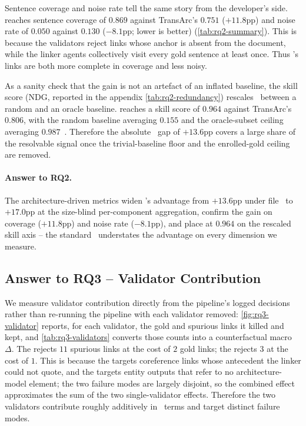 Sentence coverage and noise rate tell the same story from the developer's side.
\approach{} reaches sentence coverage of $0.869$ against TransArc's $0.751$ ($+11.8$pp) and noise rate of $0.050$ against $0.130$ ($-8.1$pp; lower is better) (\autoref{tab:rq2-summary}).
This is because the validators reject links whose anchor is absent from the document, while the linker agents collectively visit every gold sentence at least once.
Thus \approach{}'s links are both more complete in coverage and less noisy.

As a sanity check that the gain is not an artefact of an inflated baseline, the skill score (NDG, reported in the appendix \autoref{tab:rq2-redundancy}) rescales \fone\ between a random and an oracle baseline.
\approach{} reaches a skill score of $0.964$ against TransArc's $0.806$, with the random baseline averaging $0.155$ and the oracle-subset ceiling averaging $0.987$~\cite{replication}.
Therefore the absolute \fone\ gap of $+13.6$pp covers a large share of the resolvable signal once the trivial-baseline floor and the enrolled-gold ceiling are removed.

\begin{rqanswer}
\paragraph{Answer to RQ2.}
The architecture-driven metrics widen \approach{}'s advantage from $+13.6$pp under file \fone\ to $+17.0$pp at the size-blind per-component aggregation, confirm the gain on coverage ($+11.8$pp) and noise rate ($-8.1$pp), and place \approach{} at $0.964$ on the rescaled skill axis -- the standard \fone\ understates the advantage on every dimension we measure.
\end{rqanswer}

\subsection{Answer to RQ3 -- Validator Contribution}
\label{sec:results:rq3}




We measure validator contribution directly from the \fullVariant{} \approach{} pipeline's logged decisions rather than re-running the pipeline with each validator removed: \autoref{fig:rq3-validator} reports, for each validator, the gold and spurious links it killed and kept, and \autoref{tab:rq3-validators} converts those counts into a counterfactual macro $\Delta$\fone.
The \entValidator{} rejects $11$ spurious links at the cost of $2$ gold links; the \corefValidator{} rejects $3$ at the cost of $1$.
This is because the \corefValidator{} targets coreference links whose antecedent the linker could not quote, and the \entValidator{} targets entity outputs that refer to no architecture-model element; the two failure modes are largely disjoint, so the combined effect approximates the sum of the two single-validator effects.
Therefore the two validators contribute roughly additively in \fone\ terms and target distinct failure modes.

